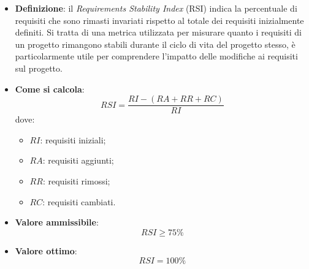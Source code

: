 \begin{itemize}
	\item \textbf{Definizione}: il \textit{Requirements Stability Index} (RSI) indica la percentuale di requisiti che sono rimasti invariati rispetto al totale dei requisiti inizialmente definiti. Si tratta di una metrica utilizzata per misurare quanto i requisiti di un progetto rimangono stabili durante il ciclo di vita del progetto stesso, è particolarmente utile per comprendere l'impatto delle modifiche ai requisiti sul progetto.
	\item \textbf{Come si calcola}: \begin{equation*}RSI = \frac{RI - (RA + RR + RC)}{RI}\end{equation*} dove:
		\begin{itemize}
			\item $RI$: requisiti iniziali;
			\item $RA$: requisiti aggiunti;
			\item $RR$: requisiti rimossi;
			\item $RC$: requisiti cambiati.
		\end{itemize}
	\item \textbf{Valore ammissibile}: \begin{equation*}RSI \geq 75\%\end{equation*}
	\item \textbf{Valore ottimo}: \begin{equation*}RSI = 100\%\end{equation*}
\end{itemize}
